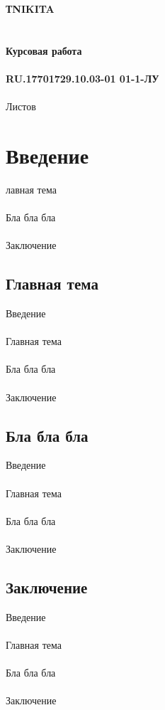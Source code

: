 \documentclass{article}
\begin{document}
\fontsize{14}{16}\selectfont
\thispagestyle{empty}
\begin{center}
\clearpage
{}
\bigskip
\begin{center}
\topskip=0pt
\vspace*{\fill}
\textbf{ТNIKITA~\\
~\\
~\\
Курсовая работа\\
~\\
RU.17701729.10.03-01 01-1-ЛУ}\\
~\\
Листов \ztotpages\\
\vspace*{\fill}
\end{center}
\begin{center}
\end{center}
\newpage
\tableofcontents
\newpage
\newpage
\section{Введение}
лавная тема\\
~\\
Бла бла бла\\
~\\
Заключение
\subsection{Главная тема}
Введение\\
~\\
Главная тема\\
~\\
Бла бла бла\\
~\\
Заключение
\subsection{Бла бла бла}
Введение\\
~\\
Главная тема\\
~\\
Бла бла бла\\
~\\
Заключение
\subsection{Заключение}
Введение\\
~\\
Главная тема\\
~\\
Бла бла бла\\
~\\
Заключение\\
~\\


\end{center}
\end{document}
